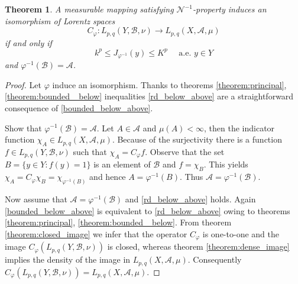 \documentclass{birkjour}
\newtheorem{thm}{Theorem}[section]
\theoremstyle{definition}
\theoremstyle{remark}
\numberwithin{equation}{section}
\begin{document}
\begin{thm}
A measurable mapping satisfying $\mathcal N^{-1}$-property 
induces an isomorphism of Lorentz spaces
$$
C_\varphi:L_{p,q}(Y, \mathcal B, \nu)\to L_{p,q}(X, \mathcal A, \mu)
$$
if and only if 
\begin{equation}\label{rd_below_above}
k^p \leq J_{\varphi^{-1}}(y) \leq K^p \quad \text{ a.e. } y\in Y
\end{equation}
and 
$\varphi^{-1}(\mathcal B) = \mathcal A$.
\end{thm}
\begin{proof}
Let $\varphi$ induce an isomorphism.
Thanks to theorems \ref{theorem:principal}, \ref{theorem:bounded_ below} 
inequalities \eqref{rd_below_above} are a straightforward consequence of \eqref{bounded_below_above}.

Show that $\varphi^{-1}(\mathcal B) = \mathcal A$. Let $A\in\mathcal A$ and $\mu(A)<\infty$, 
then the indicator function $\chi_A\in L_{p,q}(X, \mathcal A, \mu)$.
Because of the surjectivity there is a function $f\in L_{p,q}(Y, \mathcal B, \nu)$ such that
$\chi_A = C_\varphi f$. 
Observe that the set $B=\{y\in Y : f(y) = 1\}$ is an element of $\mathcal B$ and $f = \chi_B$. 
This yields $\chi_A = C_\varphi \chi_B = \chi_{\varphi^{-1}(B)}$ and hence $A=\varphi^{-1}(B)$.
Thus $\mathcal A = \varphi^{-1}(\mathcal B)$.

Now assume that $\mathcal A = \varphi^{-1}(\mathcal B)$ and \eqref{rd_below_above} holds.
Again \eqref{bounded_below_above} is equivalent to \eqref{rd_below_above} 
owing to theorems \ref{theorem:principal}, \ref{theorem:bounded_ below}. 
From theorem \ref{theorem:closed_image} we infer that the operator $C_\varphi$ is one-to-one and 
the image $C_\varphi(L_{p,q}(Y, \mathcal B, \nu))$ is closed, 
whereas theorem \ref{theorem:dense_image} implies the density of the image in 
$L_{p,q}(X, \mathcal A, \mu)$. 
Consequently $C_\varphi(L_{p,q}(Y, \mathcal B, \nu))=L_{p,q}(X, \mathcal A, \mu)$.   
  
\end{proof}
\end{document}
